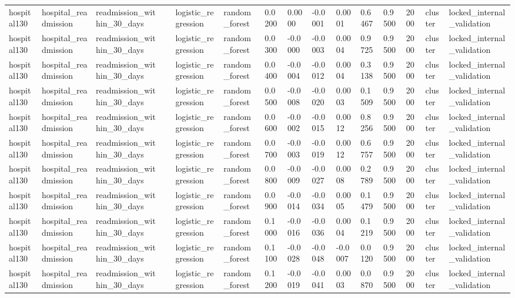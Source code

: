 \begin{tabular}{lllllllllllllll}
hospital130 & hospital\_readmission & readmission\_within\_30\_days &  & logistic\_regression & random\_forest & 0.0200 & 0.0000 & -0.0001 & 0.0001 & 0.6467 & 0.9500 & 2000 & cluster & locked\_internal\_validation \\
hospital130 & hospital\_readmission & readmission\_within\_30\_days &  & logistic\_regression & random\_forest & 0.0300 & -0.0000 & -0.0003 & 0.0004 & 0.9725 & 0.9500 & 2000 & cluster & locked\_internal\_validation \\
hospital130 & hospital\_readmission & readmission\_within\_30\_days &  & logistic\_regression & random\_forest & 0.0400 & -0.0004 & -0.0012 & 0.0004 & 0.3138 & 0.9500 & 2000 & cluster & locked\_internal\_validation \\
hospital130 & hospital\_readmission & readmission\_within\_30\_days &  & logistic\_regression & random\_forest & 0.0500 & -0.0008 & -0.0020 & 0.0003 & 0.1509 & 0.9500 & 2000 & cluster & locked\_internal\_validation \\
hospital130 & hospital\_readmission & readmission\_within\_30\_days &  & logistic\_regression & random\_forest & 0.0600 & -0.0002 & -0.0015 & 0.0012 & 0.8256 & 0.9500 & 2000 & cluster & locked\_internal\_validation \\
hospital130 & hospital\_readmission & readmission\_within\_30\_days &  & logistic\_regression & random\_forest & 0.0700 & -0.0003 & -0.0019 & 0.0012 & 0.6757 & 0.9500 & 2000 & cluster & locked\_internal\_validation \\
hospital130 & hospital\_readmission & readmission\_within\_30\_days &  & logistic\_regression & random\_forest & 0.0800 & -0.0009 & -0.0027 & 0.0008 & 0.2789 & 0.9500 & 2000 & cluster & locked\_internal\_validation \\
hospital130 & hospital\_readmission & readmission\_within\_30\_days &  & logistic\_regression & random\_forest & 0.0900 & -0.0014 & -0.0034 & 0.0005 & 0.1479 & 0.9500 & 2000 & cluster & locked\_internal\_validation \\
hospital130 & hospital\_readmission & readmission\_within\_30\_days &  & logistic\_regression & random\_forest & 0.1000 & -0.0016 & -0.0036 & 0.0004 & 0.1219 & 0.9500 & 2000 & cluster & locked\_internal\_validation \\
hospital130 & hospital\_readmission & readmission\_within\_30\_days &  & logistic\_regression & random\_forest & 0.1100 & -0.0028 & -0.0048 & -0.0007 & 0.0120 & 0.9500 & 2000 & cluster & locked\_internal\_validation \\
hospital130 & hospital\_readmission & readmission\_within\_30\_days &  & logistic\_regression & random\_forest & 0.1200 & -0.0019 & -0.0041 & 0.0003 & 0.0870 & 0.9500 & 2000 & cluster & locked\_internal\_validation \\

\end{tabular}
